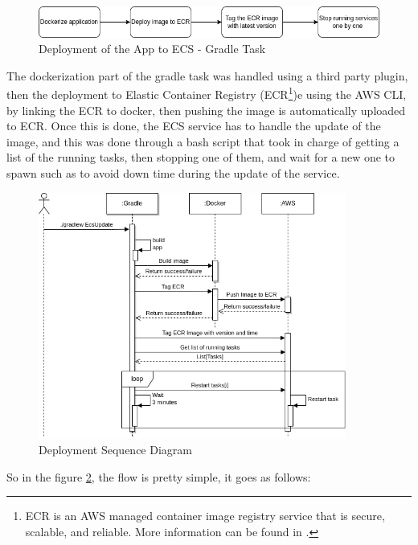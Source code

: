     \begin{figure}[!htbp]
        \centering
        \includegraphics[width=\textwidth]{images/gradle.png}
        \caption{\footnotesize{Deployment of the App to ECS - Gradle Task}}
        \label{fig:gradle}
    \end{figure}

The dockerization part of the gradle task was handled using a third party plugin,
then the deployment to Elastic Container Registry (ECR\footnote{ECR is an AWS managed
    container image registry service that is secure, scalable, and reliable. More
    information can be found in \cite{ecr_intro}.})e using the AWS CLI,
by linking the ECR to docker, then pushing the image is automatically uploaded to ECR.
Once this is done, the ECS service has to handle the update of the image, 
and this was done through a bash script that took in charge of getting a list 
of the running tasks, then stopping one of them, and wait for a new one to spawn 
such as to avoid down time during the update of the service.

    \begin{figure}[!ht]
        \centering
        \includegraphics[width=0.9\textwidth]{images/gradleTask.png}
        \caption{\footnotesize{Deployment Sequence Diagram}}
        \label{fig:deployment}
    \end{figure}

So in the figure \ref{fig:deployment}, the flow is pretty simple,
it goes as follows:

